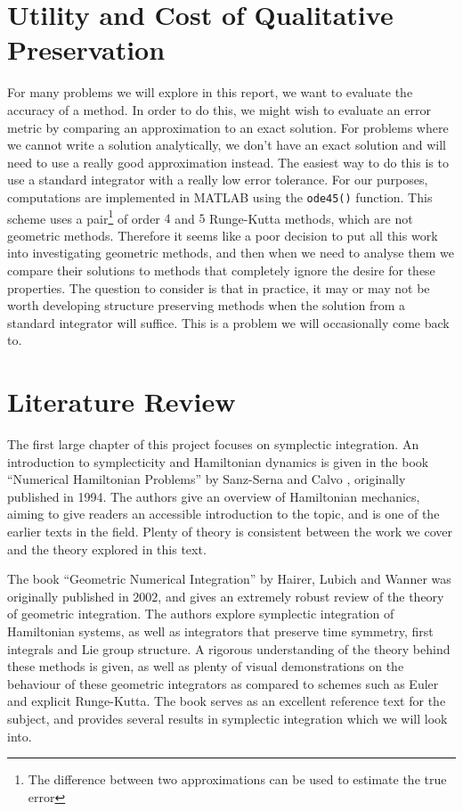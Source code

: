\documentclass{report}
\theoremstyle{exampstyle} \newtheorem{example}[theorem]{Example}
\theoremstyle{exampstyle} \newtheorem{remark}[theorem]{Remark}
\theoremstyle{exampstyle} \newtheorem{definition}[theorem]{Definition}
\theoremstyle{exampstyle} \newtheorem{lemma}[theorem]{Lemma}
\begin{document}
\section{Utility and Cost of Qualitative Preservation}


For many problems we will explore in this report, we want to evaluate the accuracy of a method.
In order to do this, we might wish to evaluate an error metric by comparing an approximation to an exact solution.
For problems where we cannot write a solution analytically, we don't have an exact solution and will need to use a really good approximation instead.
The easiest way to do this is to use a standard integrator with a really low error tolerance.
For our purposes, computations are implemented in MATLAB using the \texttt{ode45()} function.
This scheme uses a pair\footnote{
    The difference between two approximations can be used to estimate the true error
} of order $4$ and $5$ Runge-Kutta methods, which are not geometric methods.
Therefore it seems like a poor decision to put all this work into investigating geometric methods,
and then when we need to analyse them we compare their solutions to methods that completely ignore the desire for these properties.
The question to consider is that in practice, it may or may not be worth developing structure preserving methods when the solution from a standard integrator will suffice.
This is a problem we will occasionally come back to.

\section{Literature Review}

The first large chapter of this project focuses on symplectic integration.
An introduction to symplecticity and Hamiltonian dynamics is given in the book ``Numerical Hamiltonian Problems'' by Sanz-Serna and Calvo \cite{sanz2018hamiltonian}, originally published in 1994.
The authors give an overview of Hamiltonian mechanics, aiming to give readers an accessible introduction to the topic, and is one of the earlier texts in the field.
Plenty of theory is consistent between the work we cover and the theory explored in this text.

The book ``Geometric Numerical Integration'' by Hairer, Lubich and Wanner \cite{gni2006} was originally published in $2002$, and gives an extremely robust review of the theory of geometric integration.
The authors explore symplectic integration of Hamiltonian systems, as well as integrators that preserve time symmetry, first integrals and Lie group structure.
A rigorous understanding of the theory behind these methods is given, as well as plenty of visual demonstrations on the behaviour of these geometric integrators as compared to schemes such as Euler and explicit Runge-Kutta.
The book serves as an excellent reference text for the subject, and provides several results in symplectic integration which we will look into.
\end{document}
